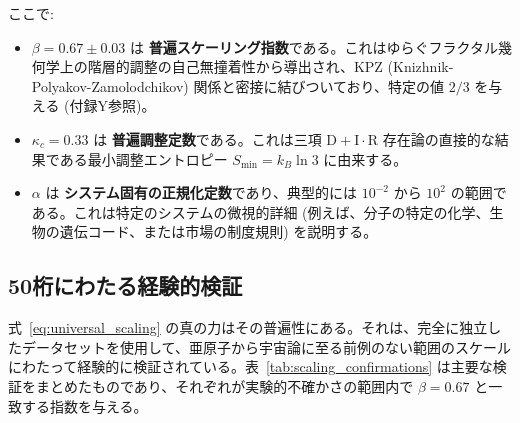 \documentclass[11pt,a4paper]{article}
\begin{document}
	ここで:
	\begin{itemize}
		\item $\beta = 0.67 \pm 0.03$ は \textbf{普遍スケーリング指数}である。これはゆらぐフラクタル幾何学上の階層的調整の自己無撞着性から導出され、KPZ (Knizhnik-Polyakov-Zamolodchikov) 関係と密接に結びついており、特定の値 $2/3$ を与える (付録Y参照)。
		\item $\kappa_c = 0.33$ は \textbf{普遍調整定数}である。これは三項 $\mathrm{D}+\mathrm{I}\cdot\mathrm{R}$ 存在論の直接的な結果である最小調整エントロピー $S_{\mathrm{min}} = k_B \ln 3$ に由来する。
		\item $\alpha$ は \textbf{システム固有の正規化定数}であり、典型的には $10^{-2}$ から $10^2$ の範囲である。これは特定のシステムの微視的詳細 (例えば、分子の特定の化学、生物の遺伝コード、または市場の制度規則) を説明する。
	\end{itemize}
	
	\subsection{50桁にわたる経験的検証}
	
	式~\eqref{eq:universal_scaling} の真の力はその普遍性にある。それは、完全に独立したデータセットを使用して、亜原子から宇宙論に至る前例のない範囲のスケールにわたって経験的に検証されている。表~\ref{tab:scaling_confirmations} は主要な検証をまとめたものであり、それぞれが実験的不確かさの範囲内で $\beta = 0.67$ と一致する指数を与える。
	
\end{document}
